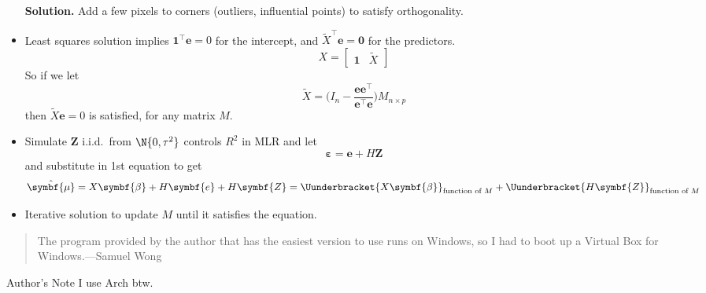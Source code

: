 \begin{itemize}
          \textbf{Solution.} Add a few pixels to corners (outliers,
          influential points) to satisfy orthogonality.
    \item Least squares solution implies $ \symbf{1}^\top \symbf{e}=0 $
          for the intercept,
          and $ \tilde{X}^\top \symbf{e}=\symbf{0} $ for the predictors.
          \[ X=\begin{bmatrix}
                  \symbf{1} & \tilde{X}
              \end{bmatrix} \]
          So if we let
          \[ \tilde{X}=\biggl(I_n-\frac{\symbf{e}\symbf{e}^\top}{\symbf{e}^\top \symbf{e}} \biggr)M_{n\times p} \]
          then $ \tilde{X} \symbf{e}=0 $ is satisfied, for any matrix $ M $.
    \item Simulate $ \symbf{Z} $ i.i.d.\ from $ \N{0,\tau^2} $
          controls $ R^2 $ in MLR and let
          \[ \symbf{\varepsilon}=\symbf{e}+H \symbf{Z} \]
          and substitute in 1st equation to get
          \[ \hat{\symbf{\mu}}=X \symbf{\beta}+H\symbf{e}+H\symbf{Z}=
              \Uunderbracket{X \symbf{\beta}}_{\text{function of }M}+\Uunderbracket{H\symbf{Z}}_{\text{function of }M} \]
    \item Iterative solution to update $ M $ until it satisfies the equation.
\end{itemize}
\begin{quote}
    The program provided by the author that has the easiest version to use
    runs on Windows, so I had to boot up a Virtual Box for Windows.---Samuel Wong
\end{quote}
\begin{Remark}{Author's Note}{}
    I use Arch btw.
\end{Remark}
